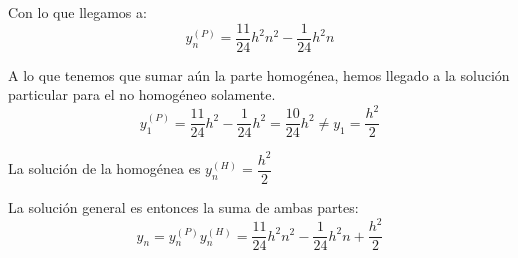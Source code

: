 \documentclass[openany]{book}
\begin{document}
\begin{exercise}
        Con lo que llegamos a:
        $$ y_n ^{(P)} = \dfrac{11}{24}h^2n^2 - \dfrac{1}{24}h^2n $$
        
        A lo que tenemos que sumar aún la parte homogénea, hemos llegado a la solución particular para el no homogéneo solamente.
        $$ y_1 ^{(P)} = \dfrac{11}{24}h^2-\dfrac{1}{24}h^2 = \dfrac{10}{24}h^2 \ne y_1 = \dfrac{h^2}{2} $$
        
        La solución de la homogénea es $ y_n ^{(H)} = \dfrac{h^2}{2} $

        La solución general es entonces la suma de ambas partes:
        $$ y_n = y_n ^{(P)} y_n ^{(H)} = \dfrac{11}{24}h^2n^2-\dfrac{1}{24}h^2n + \dfrac{h^2}{2} $$
    \end{exercise}

    \setcounter{ex}{4}
\end{document}
